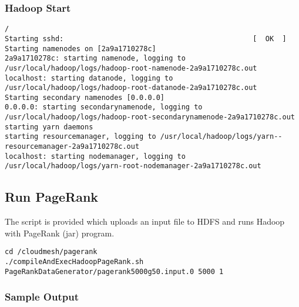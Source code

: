 \subsubsection{Hadoop Start}

\begin{lstlisting}
/
Starting sshd:                                             [  OK  ]
Starting namenodes on [2a9a1710278c]
2a9a1710278c: starting namenode, logging to /usr/local/hadoop/logs/hadoop-root-namenode-2a9a1710278c.out
localhost: starting datanode, logging to /usr/local/hadoop/logs/hadoop-root-datanode-2a9a1710278c.out
Starting secondary namenodes [0.0.0.0]
0.0.0.0: starting secondarynamenode, logging to /usr/local/hadoop/logs/hadoop-root-secondarynamenode-2a9a1710278c.out
starting yarn daemons
starting resourcemanager, logging to /usr/local/hadoop/logs/yarn--resourcemanager-2a9a1710278c.out
localhost: starting nodemanager, logging to /usr/local/hadoop/logs/yarn-root-nodemanager-2a9a1710278c.out
\end{lstlisting}

\subsection{Run PageRank}

The script is provided which uploads an input file to HDFS and runs
Hadoop with PageRank (jar) program.

\begin{lstlisting}
cd /cloudmesh/pagerank
./compileAndExecHadoopPageRank.sh PageRankDataGenerator/pagerank5000g50.input.0 5000 1
\end{lstlisting}

\subsubsection{Sample Output}

